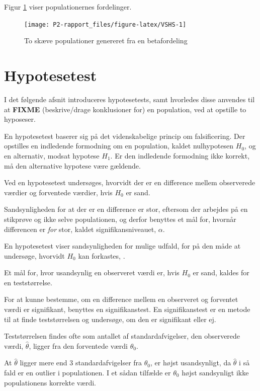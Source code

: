 \documentclass[
]{book}
\theoremstyle{definition}
\theoremstyle{definition}
\theoremstyle{definition}
\theoremstyle{remark}
\begin{document}
Figur \ref{fig:VSHS} viser populationernes fordelinger.

\begin{figure}

{\centering \texttt{[image: P2-rapport\_files/figure-latex/VSHS-1]}

}

\caption{To skæve populationer genereret fra en betafordeling}\label{fig:VSHS}
\end{figure}

\hypertarget{hypotesetest}{%
\chapter{Hypotesetest}\label{hypotesetest}}

I det følgende afsnit introduceres hypotesetests, samt hvorledes disse anvendes til at \textbf{FIXME} (beskrive/drage konklusioner for) en population, ved at opstille to hyposeser.

En hypotesetest baserer sig på det videnskabelige princip om falsificering. Der opstilles en indledende formodning om en population, kaldet nulhypotesen \(H_0\), og en alternativ, modsat hypotese \(H_1\). Er den indledende formodning ikke korrekt, må den alternative hypotese være gældende.

Ved en hypotesetest undersøges, hvorvidt der er en difference mellem observerede værdier og forventede værdier, hvis \(H_0\) er sand.

Sandsynligheden for at der er en difference er stor, eftersom der arbejdes på en stikprøve og ikke selve populationen, og derfor benyttes et mål for, hvornår differencen er \emph{for} stor, kaldet signifikansniveauet, \(\alpha\).

En hypotesetest viser sandsynligheden for mulige udfald, for på den måde at undersøge, hvorvidt \(H_0\) kan forkastes, \citep{HvorforHYPO}.

Et mål for, hvor usandsynlig en observeret værdi er, hvis \(H_0\) er sand, kaldes for en teststørrelse.

For at kunne bestemme, om en difference mellem en observeret og forventet værdi er signifikant, benyttes en signifikanstest. En signifikanstest er en metode til at finde teststørrelsen og undersøge, om den er signifikant eller ej.

Teststørrelsen findes ofte som antallet af standardafvigelser, den observerede værdi, \(\hat \theta\), ligger fra den forventede værdi \(\theta_0\).

At \(\hat \theta\) ligger mere end \(3\) standardafvigelser fra \(\theta_0\), er højst usandsynligt, da \(\hat \theta\) i så fald er en outlier i populationen. I et sådan tilfælde er \(\theta_0\) højst sandsynligt ikke populationens korrekte værdi.
\end{document}
